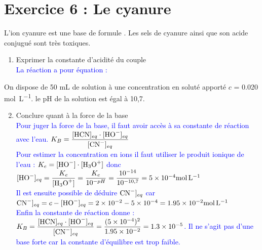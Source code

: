 \documentclass[a4paper,12pt]{article}
\begin{document}
\section*{Exercice 6 : Le cyanure}
L'ion cyanure est une base de formule . Les sels de cyanure ainsi que son acide conjugué sont très toxiques.
\begin{enumerate}
	\item Exprimer la constante d'acidité du couple\\
	\textcolor{blue}{La réaction a pour équation : }
\end{enumerate}
On dispose de \num{50} \unit{\milli \liter} de solution à une concentration en soluté apporté $c$ = \num{0,020} \unit{\mole \per \liter}. le pH de la solution est égal à 10,7.
\begin{enumerate}
\setcounter{enumi}{1}
	\item Conclure quant à la force de la base\\
	\textcolor{blue}{Pour juger la force de la base, il faut avoir accès à sa constante de réaction avec l'eau. $K_B = \dfrac{[\ce{HCN}]_{eq} \cdot [\ce{HO-}]_{eq}}{[\ce{CN-}]_{eq}}$\\ Pour estimer la concentration en ions  il faut utiliser le produit ionique de l'eau : $K_e = [\ce{HO-}]\cdot [\ce{H3O+}]$ donc $[\ce{HO-}]_{eq} = \dfrac{K_e}{[\ce{H3O+}]} = \dfrac{K_e}{10^{-pH}} = \dfrac{10^{-14}}{10^{-10,7}} =\num{5e-4}\unit{\mole\per\liter}$\\
	Il est ensuite possible de déduire $\ce{CN-}]_{eq}$ car $\ce{CN-}]_{eq}=c-[\ce{HO-}]_{eq} = \num{2e-2}-\num{5e-4} = \num{1,95e-2}\unit{\mole\per\liter}$\\
	Enfin la constante de réaction donne : $K_B = \dfrac{[\ce{HCN}]_{eq} \cdot [\ce{HO-}]_{eq}}{[\ce{CN-}]_{eq}} = \dfrac{(\num{5e-4})^2}{\num{1,95e-2}} = \num{1,3e-5}$. Il ne s'agit pas d'une base forte car la constante d'équilibre est trop faible.}
\end{enumerate}
\end{document}
